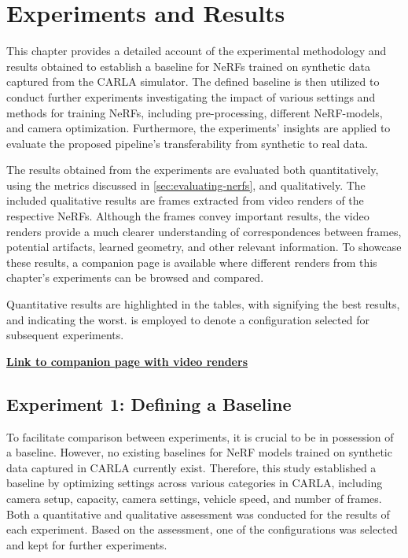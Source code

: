 \chapter{Experiments and Results} \label{sec:experiments-and-results}
This chapter provides a detailed account of the experimental methodology and results obtained to establish a baseline for NeRFs trained on synthetic data captured from the CARLA simulator. The defined baseline is then utilized to conduct further experiments investigating the impact of various settings and methods for training NeRFs, including pre-processing, different NeRF-models, and camera optimization. Furthermore, the experiments’ insights are applied to evaluate the proposed pipeline’s transferability from synthetic to real data.

The results obtained from the experiments are evaluated both quantitatively, using the metrics discussed in \autoref{sec:evaluating-nerfs}, and qualitatively. The included qualitative results are frames extracted from video renders of the respective NeRFs. Although the frames convey important results, the video renders provide a much clearer understanding of correspondences between frames, potential artifacts, learned geometry, and other relevant information. To showcase these results, a companion page is available where different renders from this chapter's experiments can be browsed and compared.

Quantitative results are highlighted in the tables, with  signifying the best results, and  indicating the worst.  is employed to denote a configuration selected for subsequent experiments.

\vspace{2mm} %
\noindent \textbf{\href{https://absorbing-peace-5f6.notion.site/NeRF-Renders-Master-thesis-34ff125e2200406588f002b36eeaacef}{Link to companion page with video renders}}


\newpage
\section{Experiment 1: Defining a Baseline}

To facilitate comparison between experiments, it is crucial to be in possession of a baseline. However, no existing baselines for NeRF models trained on synthetic data captured in CARLA currently exist. Therefore, this study established a baseline by optimizing settings across various categories in CARLA, including camera setup, capacity, camera settings, vehicle speed, and number of frames. Both a quantitative and qualitative assessment was conducted for the results of each experiment. Based on the assessment, one of the configurations was selected and kept for further experiments.


